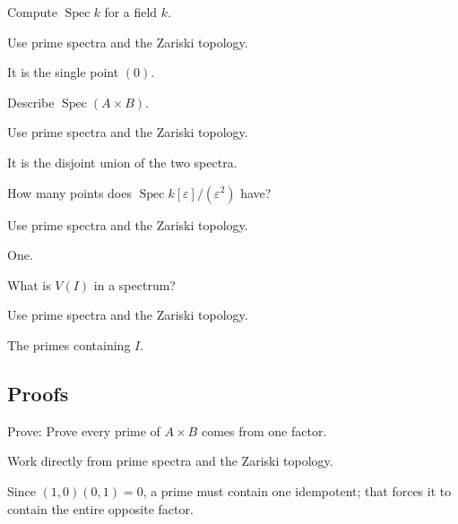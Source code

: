 \begin{exercise}\label{exr:vi07-expand-02}
Compute $\operatorname{Spec}k$ for a field $k$.
\end{exercise}
\begin{hint}
Use prime spectra and the Zariski topology.
\end{hint}
\begin{solution}
It is the single point $(0)$.
\end{solution}

\begin{exercise}\label{exr:vi07-expand-03}
Describe $\operatorname{Spec}(A\times B)$.
\end{exercise}
\begin{hint}
Use prime spectra and the Zariski topology.
\end{hint}
\begin{solution}
It is the disjoint union of the two spectra.
\end{solution}

\begin{exercise}\label{exr:vi07-expand-04}
How many points does $\operatorname{Spec}k[\varepsilon]/(\varepsilon^2)$ have?
\end{exercise}
\begin{hint}
Use prime spectra and the Zariski topology.
\end{hint}
\begin{solution}
One.
\end{solution}

\begin{exercise}\label{exr:vi07-expand-05}
What is $V(I)$ in a spectrum?
\end{exercise}
\begin{hint}
Use prime spectra and the Zariski topology.
\end{hint}
\begin{solution}
The primes containing $I$.
\end{solution}

\subsection*{Proofs}

\begin{exercise}\label{exr:vi07-expand-06}
Prove: Prove every prime of $A\times B$ comes from one factor.
\end{exercise}
\begin{hint}
Work directly from prime spectra and the Zariski topology.
\end{hint}
\begin{solution}
Since $(1,0)(0,1)=0$, a prime must contain one idempotent; that forces it to contain the entire opposite factor.
\end{solution}

